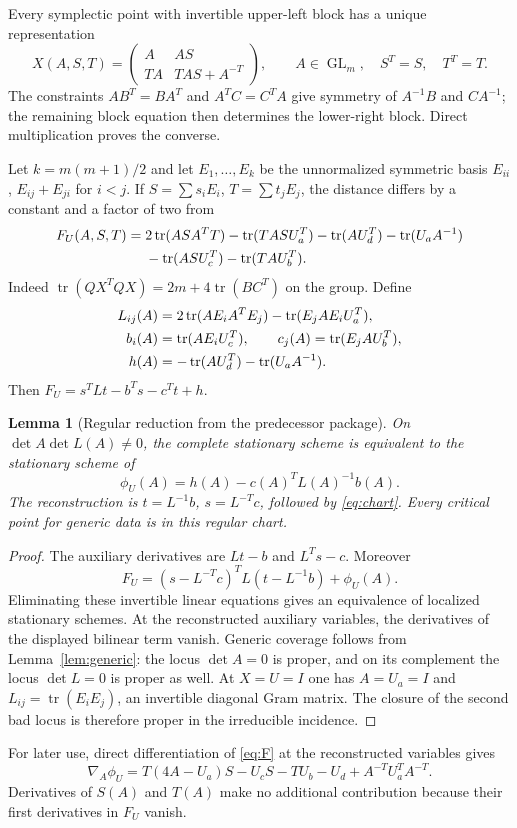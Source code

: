 \documentclass[11pt]{article}
\newtheorem{lemma}[theorem]{Lemma}
\theoremstyle{remark}\newtheorem{remark}[theorem]{Remark}
\DeclareMathOperator{\tr}{tr}
\DeclareMathOperator{\GL}{GL}
\begin{document}
Every symplectic point with invertible upper-left block has a unique representation
\begin{equation}\label{eq:chart}
X(A,S,T)=\begin{pmatrix}A&AS\\TA&TAS+A^{-T}\end{pmatrix},
\qquad A\in\GL_m,\quad S^T=S,\quad T^T=T.
\end{equation}
The constraints $AB^T=BA^T$ and $A^TC=C^TA$ give symmetry of $A^{-1}B$ and $CA^{-1}$; the remaining block equation then determines the lower-right block. Direct multiplication proves the converse.

Let $k=m(m+1)/2$ and let $E_1,\dots,E_k$ be the unnormalized symmetric basis $E_{ii}$, $E_{ij}+E_{ji}$ for $i<j$. If $S=\sum s_iE_i$, $T=\sum t_jE_j$, the distance differs by a constant and a factor of two from
\begin{align}\label{eq:F}
F_U(A,S,T)={}&2\tr(ASA^TT)-\tr(TASU_a^T)-\tr(AU_d^T)
-\tr(U_aA^{-1})\notag\\
&-\tr(ASU_c^T)-\tr(TAU_b^T).
\end{align}
Indeed $\tr(QX^TQX)=2m+4\tr(BC^T)$ on the group. Define
\begin{align}\label{eq:L}
L_{ij}(A)&=2\tr(AE_iA^TE_j)-\tr(E_jAE_iU_a^T),\notag\\
b_i(A)&=\tr(AE_iU_c^T),\qquad c_j(A)=\tr(E_jAU_b^T),\notag\\
h(A)&=-\tr(AU_d^T)-\tr(U_aA^{-1}).
\end{align}
Then $F_U=s^TLt-b^Ts-c^Tt+h$.

\begin{lemma}[Regular reduction from the predecessor package]\label{lem:oldreduction}
On $\det A\det L(A)\ne0$, the complete stationary scheme is equivalent to the stationary scheme of
\begin{equation}\label{eq:phi}
\phi_U(A)=h(A)-c(A)^TL(A)^{-1}b(A).
\end{equation}
The reconstruction is $t=L^{-1}b$, $s=L^{-T}c$, followed by \eqref{eq:chart}. Every critical point for generic data is in this regular chart.
\end{lemma}
\begin{proof}
The auxiliary derivatives are $Lt-b$ and $L^Ts-c$. Moreover
\[
F_U=(s-L^{-T}c)^TL(t-L^{-1}b)+\phi_U(A).
\]
Eliminating these invertible linear equations gives an equivalence of localized stationary schemes. At the reconstructed auxiliary variables, the derivatives of the displayed bilinear term vanish. Generic coverage follows from Lemma~\ref{lem:generic}: the locus $\det A=0$ is proper, and on its complement the locus $\det L=0$ is proper as well. At $X=U=I$ one has $A=U_a=I$ and $L_{ij}=\tr(E_iE_j)$, an invertible diagonal Gram matrix. The closure of the second bad locus is therefore proper in the irreducible incidence.
\end{proof}
For later use, direct differentiation of \eqref{eq:F} at the reconstructed variables gives
\begin{equation}\label{eq:oldgradient}
\nabla_A\phi_U=T(4A-U_a)S-U_cS-TU_b-U_d+A^{-T}U_a^TA^{-T}.
\end{equation}
Derivatives of $S(A)$ and $T(A)$ make no additional contribution because their first derivatives in $F_U$ vanish.
\end{document}
